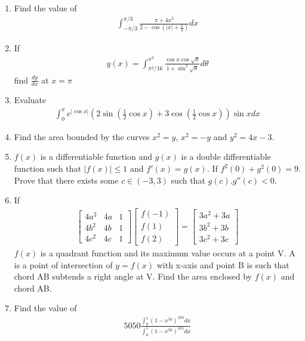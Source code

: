 \begin{enumerate}[label=\arabic*.,ref=\thesubsection.\theenumi]
\item Find the value of
\begin{align*}
\int_{-\pi/3}^{\pi/3}\frac{\pi + 4x^{3}}{2 - \cos \left(|x| + \frac{\pi}{3}\right)}dx
\end{align*}

\item If
\begin{align*}
y(x) = \int_{\pi^{2}/16}^{x^2}\frac{\cos x \cos\sqrt{\theta}}{1 + \sin^{2}\sqrt{\theta}}d\theta
\end{align*}
find $\frac{dy}{dx}$ at $x = \pi$

\item Evaluate
\begin{align*}
\int_{0}^{\pi}e^{|\cos x|}\left(2\sin\left(\frac{1}{2}\cos x\right) + 3\cos\left(\frac{1}{2}\cos x\right)\right)\sin x dx
\end{align*}

\item Find the area bounded by the curves $x^2 = y$, $x^2 = -y$ and $y^2 = 4x - 3$.

\item $f(x)$ is a differentiable function and $g(x)$ is a double differentiable function such that $|f(x)| \leq 1$ and
$f'(x) = g(x)$. If $f^2(0) + g^2(0) = 9$. Prove that there exists some $c \in (-3, 3)$ such that $g(c).g''(c) < 0$.

\item If
\begin{align*}
\begin{bmatrix}
4a^2 & 4a & 1 \\ 4b^2 & 4b & 1 \\ 4c^2 & 4c & 1
\end{bmatrix} \begin{bmatrix}
f(-1) \\ f(1) \\ f(2)
\end{bmatrix} = \begin{bmatrix}
3a^2 + 3a \\ 3b^2 + 3b \\ 3c^2 + 3c
\end{bmatrix}
\end{align*}
$f(x)$ is a quadrant function and its maximum value occurs at a point V. A is a point of intersection of $y = f(x)$ with x-axis and point B is such that chord AB subtends a right angle at V. Find the area enclosed by $f(x)$ and chord AB.

\item  Find the value of
\begin{align*}
5050\frac{\int_{0}^{1}(1 - x^{50})^{100}dx}{\int_{0}^{1}(1 - x^{50})^{101}dx}
\end{align*}


\end{enumerate}
